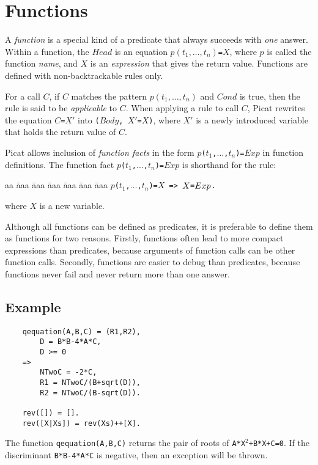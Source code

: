 \section{Functions}
A \emph{function} is a special kind of a predicate that always succeeds with \emph{one} answer. Within a function, the $Head$ is an equation $p(t_1,\ldots, t_n)$\verb+=+$X$, where $p$ is called the function \emph{name}, and $X$ is an \emph{expression} that gives the return value. Functions are defined with non-backtrackable rules only.  

For a call $C$, if $C$ matches the pattern $p(t_1,\ldots,t_n)$ and $Cond$ is true, then the rule is said to be \emph{applicable} to $C$. When applying a rule to call $C$, Picat rewrites the equation $C$\verb+=+$X'$ into \texttt{($Body$, $X'$=$X$)}, where $X'$ is a newly introduced variable that holds the return value of $C$. 

Picat allows inclusion of \emph{function facts} in the form {\tt $p$($t_1$,$\ldots$,$t_n$)\verb+=+$Exp$} in function definitions. The function fact {\tt $p$($t_1$,$\ldots$,$t_n$)\verb+=+$Exp$} is shorthand for the rule:
\begin{tabbing}
aa \= aaa \= aaa \= aaa \= aaa \= aaa \= aaa \kill
\> {\tt $p$($t_1$,$\ldots$,$t_n$)\verb+=+$X$ \verb+=>+ $X\verb+=+Exp$.}
\end{tabbing}
where $X$ is a new variable.
 
Although all functions can be defined as predicates, it is preferable to define them as functions for two reasons.  Firstly, functions often lead to more compact expressions than predicates, because arguments of function calls can be other function calls.  Secondly, functions are easier to debug than predicates, because functions never fail and never return more than one answer. 

\subsection*{Example}
\begin{verbatim}
    qequation(A,B,C) = (R1,R2), 
        D = B*B-4*A*C, 
        D >= 0 
    => 
        NTwoC = -2*C,
        R1 = NTwoC/(B+sqrt(D)),
        R2 = NTwoC/(B-sqrt(D)).

    rev([]) = [].
    rev([X|Xs]) = rev(Xs)++[X].
\end{verbatim}
The function \texttt{qequation(A,B,C)} returns the pair of roots of \texttt{A*X$^2$+B*X+C=0}. If the discriminant \texttt{B*B-4*A*C} is negative, then an exception will be thrown. 

